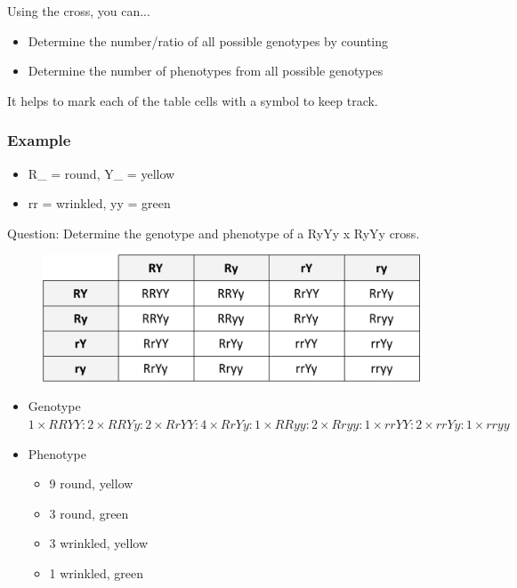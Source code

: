 \documentclass[a4paper,12pt]{article}
\begin{document}
Using the cross, you can...
\begin{itemize}
    \item{Determine the number/ratio of all possible genotypes by counting}
    \item{Determine the number of phenotypes from all possible genotypes}
\end{itemize}
It helps to mark each of the table cells with a symbol to keep track.

\subsubsection{Example}
\begin{itemize}
    \item{R\_ = round, Y\_ = yellow}
    \item{rr = wrinkled, yy = green}
\end{itemize}

Question: Determine the genotype and phenotype of a RyYy x RyYy cross.

\begin{figure}[H]
    \centering
    \includegraphics[width=\textwidth]{dihybrid}
\end{figure}

\begin{itemize}
    \item{Genotype \\ $1 \times RRYY : 2 \times RRYy : 2 \times RrYY : 4 \times RrYy : 1 \times RRyy : 2 \times Rryy : 1 \times rrYY : 2 \times rrYy : 1 \times rryy$}
    \item{
            Phenotype
            \begin{itemize}
                \item{9 round, yellow}
                \item{3 round, green}
                \item{3 wrinkled, yellow}
                \item{1 wrinkled, green}
            \end{itemize}
        }
\end{itemize}
\end{document}
